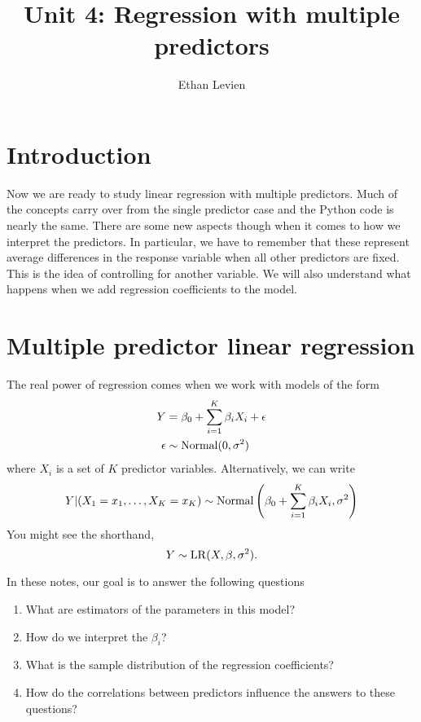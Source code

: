 
\setcounter{unit}{4}
\setcounter{section}{0}




\title{Unit 4: Regression with multiple predictors}
\author{Ethan Levien}
\maketitle


\section*{Introduction}
Now we are ready to study linear regression with multiple predictors. Much of the concepts carry over from the single predictor case and the Python code is nearly the same. There are some new aspects though when it comes to how we interpret the predictors. In particular, we have to remember that these represent average differences in the response variable when all other predictors are fixed. This is the idea of controlling for another variable. We will also understand what happens when we add regression coefficients to the model. 

\section{Multiple predictor linear regression}
The real power of regression comes when we work with models of the form 
\begin{align}
Y &= \beta_0 + \sum_{i=1}^K \beta_iX_i + \epsilon\\
\epsilon &\sim {\rm Normal}(0,\sigma^2)
\end{align}
where $X_i$ is a set of $K$ predictor variables. Alternatively, we can write
\begin{equation}
Y|(X_1=x_1,\dots,X_K=x_K) \sim {\rm Normal}\left( \beta_0 + \sum_{i=1}^K \beta_iX_i,\sigma^2\right)
\end{equation}
You might see the shorthand, 
\begin{equation}
Y \sim {\rm LR}(X,\beta,\sigma^2). 
\end{equation}

In these notes, our goal is to answer the following questions
\begin{enumerate}
\item What are estimators of the parameters in this model?
\item How do we interpret the  $\beta_i$? 
\item What is the sample distribution of the regression coefficients? 
\item How do the correlations between predictors influence the answers to these questions? 
\end{enumerate}



